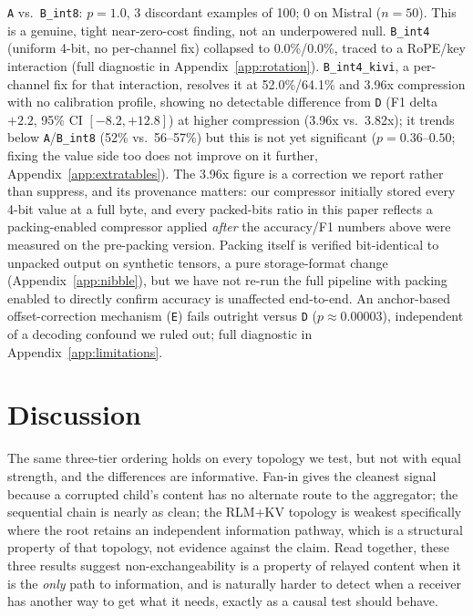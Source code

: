 \documentclass[11pt]{article}
\begin{document}
\texttt{A} vs.\ \texttt{B\_int8}: $p=1.0$, 3 discordant examples of 100;
0 on Mistral ($n=50$). This is a genuine, tight near-zero-cost finding,
not an underpowered null. \texttt{B\_int4} (uniform 4-bit, no
per-channel fix) collapsed to 0.0\%/0.0\%, traced to a RoPE/key
interaction (full diagnostic in Appendix~\ref{app:rotation}).
\texttt{B\_int4\_kivi}, a per-channel fix for that interaction,
resolves it at 52.0\%/64.1\% and 3.96x compression with no calibration
profile, showing no detectable difference from \texttt{D} (F1 delta
$+2.2$, 95\% CI $[-8.2, +12.8]$) at higher compression (3.96x
vs.\ 3.82x); it trends below \texttt{A}/\texttt{B\_int8} (52\% vs.\
56--57\%) but this is not yet significant ($p=0.36$--$0.50$; fixing the
value side too does not improve on it further,
Appendix~\ref{app:extratables}). The 3.96x figure is a correction we
report rather than suppress, and its provenance matters: our
compressor initially stored every 4-bit value at a full byte, and
every packed-bits ratio in this paper reflects a packing-enabled
compressor applied \emph{after} the accuracy/F1 numbers above were
measured on the pre-packing version. Packing itself is verified
bit-identical to unpacked output on synthetic tensors, a pure
storage-format change (Appendix~\ref{app:nibble}), but we have not
re-run the full pipeline with packing enabled to directly confirm
accuracy is unaffected end-to-end. An anchor-based offset-correction
mechanism (\texttt{E}) fails outright versus \texttt{D}
($p\approx0.00003$), independent of a decoding confound we ruled out;
full diagnostic in Appendix~\ref{app:limitations}.

\section{Discussion}

The same three-tier ordering holds on every topology we test, but not
with equal strength, and the differences are informative. Fan-in gives
the cleanest signal because a corrupted child's content has no
alternate route to the aggregator; the sequential chain is nearly as
clean; the RLM+KV topology is weakest specifically where the root
retains an independent information pathway, which is a structural
property of that topology, not evidence against the claim. Read
together, these three results suggest non-exchangeability is a
property of relayed content when it is the \emph{only} path to
information, and is naturally harder to detect when a receiver has
another way to get what it needs, exactly as a causal test should
behave.
\end{document}
